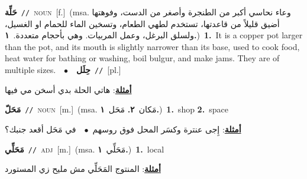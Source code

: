 \documentclass[10pt,a4paper,twoside]{article} %
\begin{document}
\begin{multicols}{2}
{\setlength\topsep{0pt}\textbf{\foreignlanguage{arabic}{حَلِّة}}\ {\color{gray}\texttt{//}\color{black}}\ \textsc{noun}\ [f.]\ \color{gray}(msa. \foreignlanguage{arabic}{وعاء نحاسي أكبر من الطنجرة وأصغر من الدست، وفوهتها أضيق قليلاً من قاعدتها، تستخدم لطهي الطعام، وتسخين الماء للحمام او الغسيل، ولسلق البرغل، وعمل المربيات. وهي بأحجام متعددة.}~\foreignlanguage{arabic}{\textbf{١.}})\color{black}\ \textbf{1.}~It is a copper pot larger than the pot, and its mouth is slightly narrower than its base, used to cook food, heat water for bathing or washing, boil bulgur, and make jams. They are of multiple sizes.\ \ $\bullet$\ \ \setlength\topsep{0pt}\textbf{\foreignlanguage{arabic}{حِلَل}}\ {\color{gray}\texttt{//}\color{black}}\ [pl.]\  \begin{flushright}\color{gray}\foreignlanguage{arabic}{\textbf{\underline{\foreignlanguage{arabic}{أمثلة}}}: هاتي الحلة بدي أسخن مي فيها}\end{flushright}\color{black}} \vspace{2mm}

{\setlength\topsep{0pt}\textbf{\foreignlanguage{arabic}{مَحَلّ}}\ {\color{gray}\texttt{//}\color{black}}\ \textsc{noun}\ [m.]\ \color{gray}(msa. \foreignlanguage{arabic}{مَكان}~\foreignlanguage{arabic}{\textbf{٢.}}  \foreignlanguage{arabic}{مَحَل}~\foreignlanguage{arabic}{\textbf{١.}})\color{black}\ \textbf{1.}~shop  \textbf{2.}~space\  \begin{flushright}\color{gray}\foreignlanguage{arabic}{\textbf{\underline{\foreignlanguage{arabic}{أمثلة}}}: إِجى عنترة وكسَر المحل فوق روسهم\ $\bullet$\ \  في مَحَل أقعد جنبك؟}\end{flushright}\color{black}} \vspace{2mm}

{\setlength\topsep{0pt}\textbf{\foreignlanguage{arabic}{مَحَلِّي}}\ {\color{gray}\texttt{//}\color{black}}\ \textsc{adj}\ [m.]\ \color{gray}(msa. \foreignlanguage{arabic}{مَحَلِّي}~\foreignlanguage{arabic}{\textbf{١.}})\color{black}\ \textbf{1.}~local\  \begin{flushright}\color{gray}\foreignlanguage{arabic}{\textbf{\underline{\foreignlanguage{arabic}{أمثلة}}}: المنتوج المَحَلِّي مش مليح زي المستورد}\end{flushright}\color{black}} \vspace{2mm}


\end{multicols}
\end{document}
